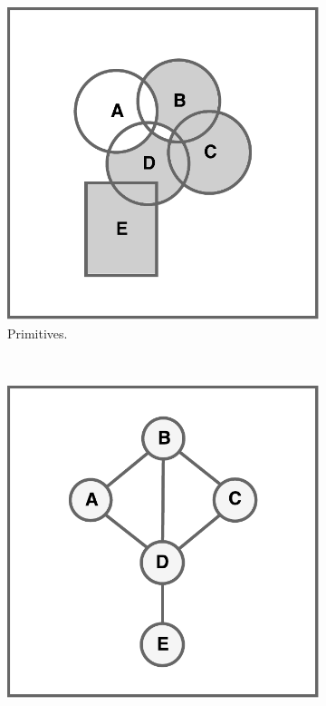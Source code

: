 \begin{figure}[htb]
	\centering
	\begin{subfigure}[t]{0.30\linewidth}
		\includegraphics[width=\textwidth]{figures/pipe_0.pdf}
		\caption{Primitives.}
		\label{fig:pipe0}
	\end{subfigure}
	~
	\begin{subfigure}[t]{0.30\linewidth}
		\includegraphics[width=\textwidth]{figures/pipe_1.pdf}

\end{subfigure}
\end{figure}

